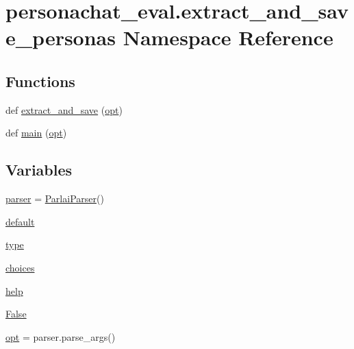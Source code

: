 \hypertarget{namespacepersonachat__eval_1_1extract__and__save__personas}{}\section{personachat\+\_\+eval.\+extract\+\_\+and\+\_\+save\+\_\+personas Namespace Reference}
\label{namespacepersonachat__eval_1_1extract__and__save__personas}
\subsection*{Functions}
\begin{DoxyCompactItemize}
\item 
def \hyperlink{namespacepersonachat__eval_1_1extract__and__save__personas_a7bae99c34a0b3f49cbce1328146926fd}{extract\+\_\+and\+\_\+save} (\hyperlink{namespacepersonachat__eval_1_1extract__and__save__personas_af8429edf17061783a8e88df2612ed634}{opt})
\item 
def \hyperlink{namespacepersonachat__eval_1_1extract__and__save__personas_aa39f496bc78dfa28c1fbc2c4129a915c}{main} (\hyperlink{namespacepersonachat__eval_1_1extract__and__save__personas_af8429edf17061783a8e88df2612ed634}{opt})
\end{DoxyCompactItemize}
\subsection*{Variables}
\begin{DoxyCompactItemize}
\item 
\hyperlink{namespacepersonachat__eval_1_1extract__and__save__personas_a0c7a023ff3a444b10a5a7241dcb2a654}{parser} = \hyperlink{classparlai_1_1core_1_1params_1_1ParlaiParser}{Parlai\+Parser}()
\item 
\hyperlink{namespacepersonachat__eval_1_1extract__and__save__personas_ad30dd7296027c9500819dc1c99da8bb7}{default}
\item 
\hyperlink{namespacepersonachat__eval_1_1extract__and__save__personas_aaa2aa8bccd8967599740aecfd4d8cde9}{type}
\item 
\hyperlink{namespacepersonachat__eval_1_1extract__and__save__personas_a62bbb0f78fbe1dca79fe9a5c30586588}{choices}
\item 
\hyperlink{namespacepersonachat__eval_1_1extract__and__save__personas_a691998cfb8d73e52c4ca6e116c026e31}{help}
\item 
\hyperlink{namespacepersonachat__eval_1_1extract__and__save__personas_a7badd33b93a306d071f1c5c813dcf242}{False}
\item 
\hyperlink{namespacepersonachat__eval_1_1extract__and__save__personas_af8429edf17061783a8e88df2612ed634}{opt} = parser.\+parse\+\_\+args()
\end{DoxyCompactItemize}


